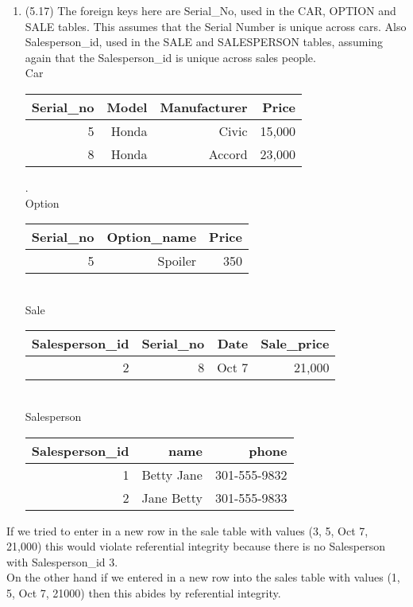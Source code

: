 \documentclass[11pt,fleqn]{article}
\begin{document}
\begin{enumerate}
\item (5.17) %
The foreign keys here are Serial\_No, used in the CAR, OPTION and SALE tables. This assumes that the Serial Number is unique across cars. Also Salesperson\_id, used in the SALE and SALESPERSON tables, assuming again that the Salesperson\_id is unique across sales people. \\
Car\\
\begin{tabular}{|r|r|r|r|}
  \hline
	Serial\_no & Model & Manufacturer & Price \\
  \hline
     5    & Honda & Civic & 15,000\\
     8    & Honda & Accord & 23,000 \\
	\hline
  \end{tabular}
.\\
Option\\
\begin{tabular}{|r|r|r|}
  \hline
	Serial\_no & Option\_name & Price\\
	\hline
	5 & Spoiler &  350\\
  \hline
  \end{tabular}
\\
Sale\\
\begin{tabular}{|r|r|r|r|}
  \hline
	Salesperson\_id & Serial\_no & Date & Sale\_price\\
	\hline
    2   & 8 & Oct 7 & 21,000\\
  \hline
  \end{tabular}
\\
Salesperson\\
\begin{tabular}{|r|r|r|}
  \hline
	Salesperson\_id & name & phone \\
  \hline
	1 &Betty Jane & 301-555-9832 \\
   2 & Jane Betty & 301-555-9833 \\
	\hline
  \end{tabular}
\end{enumerate}
If we tried to enter in a new row in the sale table with values (3, 5, Oct 7, 21,000) this would violate referential integrity because there is no Salesperson with Salesperson\_id 3.\\ 
On the other hand if we entered in a new row into the sales table with values (1, 5, Oct 7, 21000) then this abides by referential integrity. 
\end{document}
